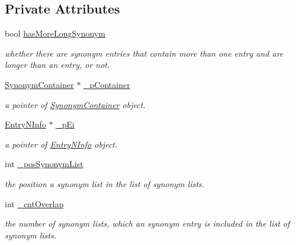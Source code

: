\subsection*{Private Attributes}
\begin{CompactItemize}
\item 
bool \hyperlink{classkmaOrange_1_1Synonym_39a70d8546ba006043d510c7c9439296}{hasMoreLongSynonym}
\begin{CompactList}\small\item\em whether there are synonym entries that contain more than one entry and are longer than an entry, or not. \item\end{CompactList}\item 
\hyperlink{classkmaOrange_1_1SynonymContainer}{SynonymContainer} $\ast$ \hyperlink{classkmaOrange_1_1Synonym_f7c63e33c3c7216502bbb8c20e347663}{\_\-pContainer}
\begin{CompactList}\small\item\em a pointer of \hyperlink{classkmaOrange_1_1SynonymContainer}{SynonymContainer} object. \item\end{CompactList}\item 
\hyperlink{classkmaOrange_1_1EntryNInfo}{EntryNInfo} $\ast$ \hyperlink{classkmaOrange_1_1Synonym_1a32ce984031ad0c9e93500443b66853}{\_\-pEi}
\begin{CompactList}\small\item\em a pointer of \hyperlink{classkmaOrange_1_1EntryNInfo}{EntryNInfo} object. \item\end{CompactList}\item 
int \hyperlink{classkmaOrange_1_1Synonym_088adf1a98bb1770a497cd8203e54af0}{\_\-posSynonymList}
\begin{CompactList}\small\item\em the position a synonym list in the list of synonym lists. \item\end{CompactList}\item 
int \hyperlink{classkmaOrange_1_1Synonym_b204328a0e9c941a61a6871d12e8b633}{\_\-cntOverlap}
\begin{CompactList}\small\item\em the number of synonym lists, which an synonym entry is included in the list of synonym lists. \item\end{CompactList}\end{CompactItemize}


